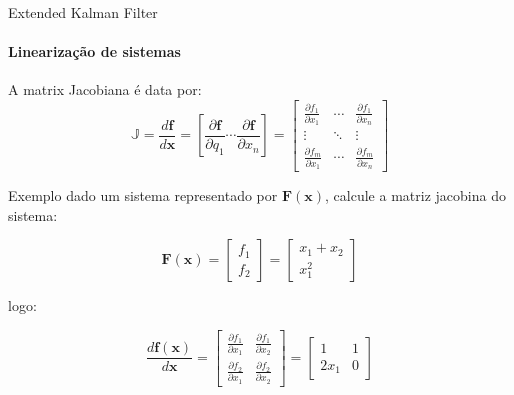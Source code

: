 \documentclass[aspectratio=169]{beamer}
\begin{document}
\begin{frame}[c]{Extended Kalman Filter}
    \framesubtitle{Linearização de sistemas}
       A matrix Jacobiana é data por:
        \begin{equation*}
        \mathbb{J}
        =
        \frac{d \mathbf{f}}{d \mathbf{x}}
        =
        \left[ \frac{\partial \mathbf{f}}{\partial q_1}
            \cdots \frac{\partial \mathbf{f}}{\partial x_n} \right]
        =
        \begin{bmatrix}
            \frac{\partial f_1}{\partial x_1} & \cdots &
            \frac{\partial f_1}{\partial x_n}                   \\
            \vdots                            & \ddots & \vdots \\
            \frac{\partial f_m}{\partial x_1} & \cdots &
            \frac{\partial f_m}{\partial x_n}
        \end{bmatrix}
    \end{equation*}
    
    \begin{block}{Exemplo}
        dado um sistema representado por $\mathbf{F(x)}$, calcule a
    matriz jacobina do sistema:
    
    \begin{equation*}
        \mathbf{F(x)}
        =
        \begin{bmatrix}
            f_1 \\
            f_2
        \end{bmatrix}
        =
        \begin{bmatrix}
            x_1 + x_2 \\
            x_1^2
        \end{bmatrix}
    \end{equation*}
    
    logo:

    \begin{equation*}
        \frac{d \mathbf{f(x)}}{d \mathbf{x}}
        =
        \begin{bmatrix}
            \frac{\partial f_1}{\partial x_1} &
            \frac{\partial f_1}{\partial x_2} \\
            \frac{\partial f_2}{\partial x_1} &
            \frac{\partial f_2}{\partial x_2}
        \end{bmatrix}
        =
        \begin{bmatrix}
            1 & 1 \\
            2x_1 & 0
        \end{bmatrix}
    \end{equation*}
\end{block}


\end{frame}
\end{document}
